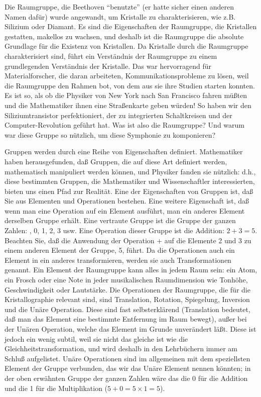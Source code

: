 Die Raumgruppe, die Beethoven \enquote{benutzte} (er hatte sicher einen anderen Namen dafür) wurde angewandt, um Kristalle zu charakterisieren, wie z.B. Silizium oder Diamant.
Es sind die Eigenschaften der Raumgruppe, die Kristallen gestatten, makellos zu wachsen, und deshalb ist die Raumgruppe die absolute Grundlage für die Existenz von Kristallen.
Da Kristalle durch die Raumgruppe charakterisiert sind, führt ein Verständnis der Raumgruppe zu einem grundlegenden Verständnis der Kristalle.
Das war hervorragend für Materialforscher, die daran arbeiteten, Kommunikationsprobleme zu lösen, weil die Raumgruppe den Rahmen bot, von dem aus sie ihre Studien starten konnten.
Es ist so, als ob die Physiker von New York nach San Francisco fahren müßten und die Mathematiker ihnen eine Straßenkarte geben würden!
So haben wir den Siliziumtransistor perfektioniert, der zu integrierten Schaltkreisen und der Computer-Revolution geführt hat.
Was ist also die Raumgruppe? Und warum war diese Gruppe so nützlich, um diese Symphonie zu komponieren?

Gruppen werden durch eine Reihe von Eigenschaften definiert.
Mathematiker haben herausgefunden, daß Gruppen, die auf diese Art definiert werden, mathematisch manipuliert werden können, und Physiker fanden sie nützlich: d.h., diese bestimmten Gruppen, die Mathematiker und Wissenschaftler interessierten, bieten uns einen Pfad zur Realität.
Eine der Eigenschaften von Gruppen ist, daß Sie aus Elementen und Operationen bestehen.
Eine weitere Eigenschaft ist, daß wenn man eine Operation auf ein Element ausführt, man ein anderes Element derselben Gruppe erhält.
Eine vertraute Gruppe ist die Gruppe der ganzen Zahlen: , 0, 1, 2, 3 usw.
Eine Operation dieser Gruppe ist die Addition: $2 + 3 = 5$.
Beachten Sie, daß die Anwendung der Operation + auf die Elemente 2 und 3 zu einem anderen Element der Gruppe, 5, führt.
Da die Operationen auch ein Element in ein anderes transformieren, werden sie auch Transformationen genannt.
Ein Element der Raumgruppe kann alles in jedem Raum sein: ein Atom, ein Frosch oder eine Note in jeder musikalischen Raumdimension wie Tonhöhe, Geschwindigkeit oder Lautstärke.
Die Operationen der Raumgruppe, die für die Kristallographie relevant sind, sind Translation, Rotation, Spiegelung, Inversion und die Unäre Operation.
Diese sind fast selbsterklärend (Translation bedeutet, daß man das Element eine bestimmte Entfernung im Raum bewegt), außer bei der Unären Operation, welche das Element im Grunde unverändert läßt.
Diese ist jedoch ein wenig subtil, weil sie nicht das gleiche ist wie die Gleichheitstransformation, und wird deshalb in den Lehrbüchern immer am Schluß aufgelistet.
Unäre Operationen sind im allgemeinen mit dem speziellsten Element der Gruppe verbunden, das wir das Unäre Element nennen könnten; in der oben erwähnten Gruppe der ganzen Zahlen wäre das die 0 für die Addition und die 1 für die Multiplikation ($5+0 = 5\times1 = 5$).

